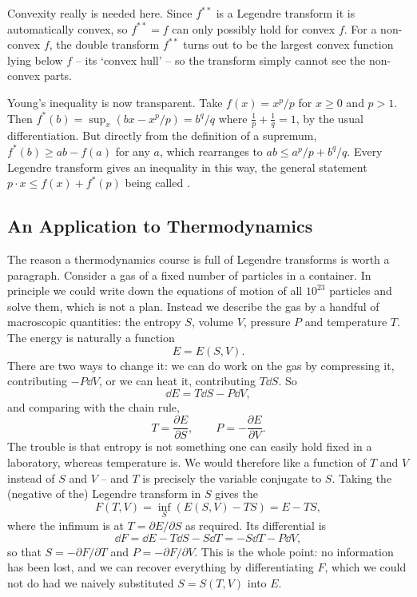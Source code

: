 \documentclass[a4paper]{scrartcl}
\begin{document}
Convexity really is needed here. Since $f^{**}$ is a Legendre transform it is automatically convex, so $f^{**} = f$ can only possibly hold for convex $f$. For a non-convex $f$, the double transform $f^{**}$ turns out to be the largest convex function lying below $f$ -- its `convex hull' -- so the transform simply cannot see the non-convex parts.

\begin{remark}
	Young's inequality is now transparent. Take $f(x) = x^p/p$ for $x \geq 0$ and $p > 1$. Then $f^*(b) = \sup_x(bx - x^p/p) = b^q/q$ where $\frac 1p + \frac 1q = 1$, by the usual differentiation. But directly from the definition of a supremum, $f^*(b) \geq ab - f(a)$ for any $a$, which rearranges to $ab \leq a^p/p + b^q/q$. Every Legendre transform gives an inequality in this way, the general statement $p\cdot x \leq f(x) + f^*(p)$ being called .
\end{remark}

\subsection{An Application to Thermodynamics}

The reason a thermodynamics course is full of Legendre transforms is worth a paragraph. Consider a gas of a fixed number of particles in a container. In principle we could write down the equations of motion of all $10^{23}$ particles and solve them, which is not a plan. Instead we describe the gas by a handful of macroscopic quantities: the entropy $S$, volume $V$, pressure $P$ and temperature $T$. The energy is naturally a function
$$
E = E(S, V).
$$
There are two ways to change it: we can do work on the gas by compressing it, contributing $-P\dd V$, or we can heat it, contributing $T \dd S$. So
$$
\dd E = T \dd S - P \dd V,
$$
and comparing with the chain rule,
$$
T = \frac{\partial E}{\partial S}, \qquad P = -\frac{\partial E}{\partial V}.
$$
The trouble is that entropy is not something one can easily hold fixed in a laboratory, whereas temperature is. We would therefore like a function of $T$ and $V$ instead of $S$ and $V$ -- and $T$ is precisely the variable conjugate to $S$. Taking the (negative of the) Legendre transform in $S$ gives the 
$$
F(T, V) = \inf_S\left(E(S, V) - TS\right) = E - TS,
$$
where the infimum is at $T = \partial E/\partial S$ as required. Its differential is
$$
\dd F = \dd E - T \dd S - S \dd T = -S\dd T - P \dd V,
$$
so that $S = -\partial F/\partial T$ and $P = -\partial F /\partial V$. This is the whole point: no information has been lost, and we can recover everything by differentiating $F$, which we could not do had we naively substituted $S = S(T, V)$ into $E$.
\end{document}
